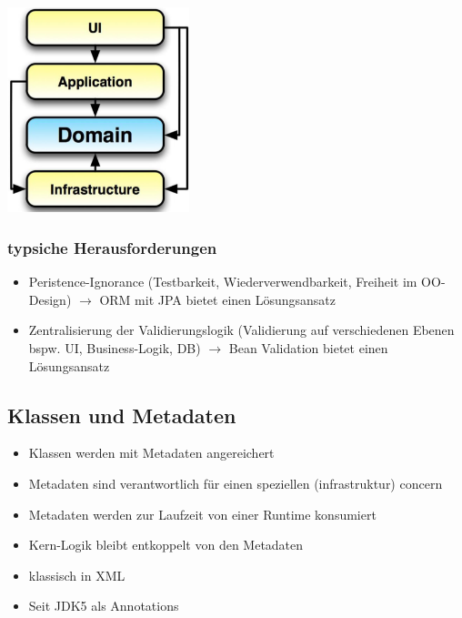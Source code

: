 \documentclass{report}
\newenvironment{Figure}
	{\par\medskip\noindent\minipage{\linewidth}}
	{\endminipage\par\medskip}
\theoremstyle{definition}
\theoremstyle{example}
\begin{document}
\begin{Figure}
\centering
\includegraphics[width=200px]{img/JPADomainLayer.png}
	\label{fig:Architektur des Domain Layer}
\end{Figure}

\subsubsection{typsiche Herausforderungen}
\begin{itemize}
	\item Peristence-Ignorance (Testbarkeit, Wiederverwendbarkeit, Freiheit im OO-Design) $\rightarrow$ ORM mit JPA bietet einen Lösungsansatz
	\item Zentralisierung der Validierungslogik (Validierung auf verschiedenen Ebenen bspw. UI, Business-Logik, DB) $\rightarrow$ Bean Validation bietet einen Lösungsansatz
\end{itemize}

\subsection{Klassen und Metadaten}
\begin{itemize}
	\item Klassen werden mit Metadaten angereichert
	\item Metadaten sind verantwortlich für einen speziellen (infrastruktur) concern
	\item Metadaten werden zur Laufzeit von einer Runtime konsumiert
	\item Kern-Logik bleibt entkoppelt von den Metadaten
	\item klassisch in XML
	\item Seit JDK5 als Annotations
\end{itemize}
\end{document}

